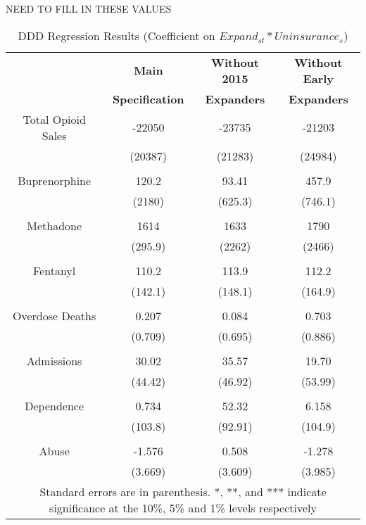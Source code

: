 \documentclass[11pt]{article}
\begin{document}
NEED TO FILL IN THESE VALUES
\begin{table}[!h]
\centering
\caption{DDD Regression Results (Coefficient on $Expand_{st}*Uninsurance_s$)}
\label{DDD1}
\begin{tabular}{cccc}
\hline
\textbf{} &
\textbf{Main} & \textbf{Without 2015} & {\textbf{Without Early}}  \\ 
& \textbf{Specification} & \textbf{Expanders} & {\textbf{Expanders}}  \\ \hline
Total Opioid Sales & -22050 & -23735 & -21203 \\
                           & (20387) & (21283) & (24984)\\  
& & & \\   
Buprenorphine & 120.2 & 93.41 & 457.9 \\
                      & (2180) & (625.3) & (746.1) \\ 
& & & \\
Methadone & 1614 & 1633  & 1790\\
                 & (295.9) & (2262) & (2466) \\ 
& & & \\
Fentanyl & 110.2 & 113.9  &  112.2\\
              & (142.1) & (148.1) & (164.9) \\ 

& & & \\
Overdose Deaths & 0.207 & 0.084 & 0.703  \\ 
                          & (0.709) & (0.695) & (0.886) \\ 
& & & \\
Admissions & 30.02 & 35.57 & 19.70  \\
                 & (44.42) & (46.92) & (53.99)\\ 
& & & \\
Dependence & 0.734 & 52.32 & 6.158\\
                   & (103.8) & (92.91) & (104.9)\\ 
& & & \\
Abuse &-1.576 & 0.508 & -1.278\\
           & (3.669) & (3.609) & (3.985)\\ 
\hline
 \multicolumn{4}{c}{\tiny{Standard errors are in parenthesis.  *, **, and *** indicate significance at the 10\%, 5\% and 1\% levels respectively}} \\
\hline
\end{tabular}
\end{table}
\end{document}
